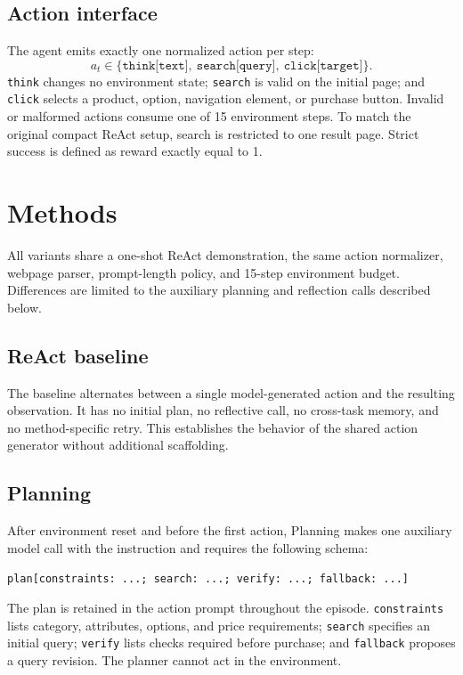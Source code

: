 \documentclass{article}
\begin{document}
\subsection{Action interface}

The agent emits exactly one normalized action per step:
\begin{equation}
 a_t \in \{\texttt{think[text]},\ \texttt{search[query]},\ \texttt{click[target]}\}.
\end{equation}
\texttt{think} changes no environment state; \texttt{search} is valid on the initial page; and \texttt{click} selects a product, option, navigation element, or purchase button. Invalid or malformed actions consume one of 15 environment steps. To match the original compact ReAct setup, search is restricted to one result page. Strict success is defined as reward exactly equal to 1.

\section{Methods}

All variants share a one-shot ReAct demonstration, the same action normalizer, webpage parser, prompt-length policy, and 15-step environment budget. Differences are limited to the auxiliary planning and reflection calls described below.

\subsection{ReAct baseline}

The baseline alternates between a single model-generated action and the resulting observation. It has no initial plan, no reflective call, no cross-task memory, and no method-specific retry. This establishes the behavior of the shared action generator without additional scaffolding.

\subsection{Planning}

After environment reset and before the first action, Planning makes one auxiliary model call with the instruction and requires the following schema:
\begin{center}
{\small\texttt{plan[constraints: ...; search: ...; verify: ...; fallback: ...]}\par}
\end{center}
The plan is retained in the action prompt throughout the episode. \texttt{constraints} lists category, attributes, options, and price requirements; \texttt{search} specifies an initial query; \texttt{verify} lists checks required before purchase; and \texttt{fallback} proposes a query revision. The planner cannot act in the environment.
\end{document}
